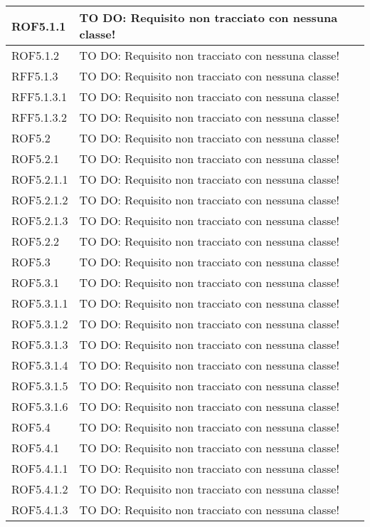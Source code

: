 \begin{center}
\begin{longtable}{| p{2.5cm} | p{11cm} |}
ROF5.1.1 & TO DO: Requisito non tracciato con nessuna classe! \\
\hline
ROF5.1.2 & TO DO: Requisito non tracciato con nessuna classe! \\
\hline
RFF5.1.3 & TO DO: Requisito non tracciato con nessuna classe! \\
\hline
RFF5.1.3.1 & TO DO: Requisito non tracciato con nessuna classe! \\
\hline
RFF5.1.3.2 & TO DO: Requisito non tracciato con nessuna classe! \\
\hline
ROF5.2 & TO DO: Requisito non tracciato con nessuna classe! \\
\hline
ROF5.2.1 & TO DO: Requisito non tracciato con nessuna classe! \\
\hline
ROF5.2.1.1 & TO DO: Requisito non tracciato con nessuna classe! \\
\hline
ROF5.2.1.2 & TO DO: Requisito non tracciato con nessuna classe! \\
\hline
ROF5.2.1.3 & TO DO: Requisito non tracciato con nessuna classe! \\
\hline
ROF5.2.2 & TO DO: Requisito non tracciato con nessuna classe! \\
\hline
ROF5.3 & TO DO: Requisito non tracciato con nessuna classe! \\
\hline
ROF5.3.1 & TO DO: Requisito non tracciato con nessuna classe! \\
\hline
ROF5.3.1.1 & TO DO: Requisito non tracciato con nessuna classe! \\
\hline
ROF5.3.1.2 & TO DO: Requisito non tracciato con nessuna classe! \\
\hline
ROF5.3.1.3 & TO DO: Requisito non tracciato con nessuna classe! \\
\hline
ROF5.3.1.4 & TO DO: Requisito non tracciato con nessuna classe! \\
\hline
ROF5.3.1.5 & TO DO: Requisito non tracciato con nessuna classe! \\
\hline
ROF5.3.1.6 & TO DO: Requisito non tracciato con nessuna classe! \\
\hline
ROF5.4 & TO DO: Requisito non tracciato con nessuna classe! \\
\hline
ROF5.4.1 & TO DO: Requisito non tracciato con nessuna classe! \\
\hline
ROF5.4.1.1 & TO DO: Requisito non tracciato con nessuna classe! \\
\hline
ROF5.4.1.2 & TO DO: Requisito non tracciato con nessuna classe! \\
\hline
ROF5.4.1.3 & TO DO: Requisito non tracciato con nessuna classe! \\

\end{longtable}
\end{center}
